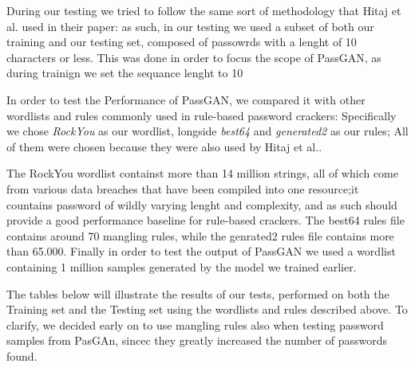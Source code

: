 During our testing we tried to follow the same sort of methodology that Hitaj et al.\cite{PassGAN} used in their paper: as such, in our testing we used a subset of both our training  and our testing set, composed of passowrds with a lenght of 10 characters or less. This was done in order to focus the scope of PassGAN, as during trainign we set the sequance lenght to 10 %

In order to test the Performance of PassGAN, we compared it with other wordlists and rules commonly used in rule-based password crackers: Specifically we chose \emph{RockYou} as our wordlist, longside \emph{best64} and \emph{generated2} as our rules; All of them were chosen because they were also used by Hitaj et al.\cite{PassGAN}.

The RockYou wordlist containst more than 14 million strings, all of which come from various data breaches that have been compiled into one resource;it countains password of wildly varying lenght and complexity, and as such should provide a good performance baseline for rule-based crackers. The best64 rules file contains around 70 mangling rules, while the genrated2 rules file contains more than 65.000. 
Finally in order to test the output of PassGAN we used a wordlist containing 1 million samples generated by the model we trained earlier.

The tables below will illustrate the results of our tests, performed on both the Training set and the Testing set using the wordlists and rules described above. To clarify, we decided early on to use mangling rules also when testing password samples from PasGAn, sincec they greatly increased the number of passwords found.
